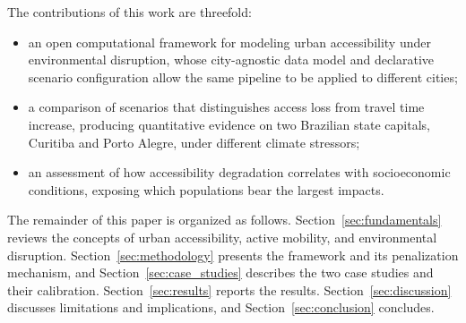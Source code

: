 The contributions of this work are threefold:

\begin{itemize}
  \item an open computational framework for modeling urban accessibility under environmental disruption, whose city-agnostic data model and declarative scenario configuration allow the same pipeline to be applied to different cities;
  \item a comparison of scenarios that distinguishes access loss from travel time increase, producing quantitative evidence on two Brazilian state capitals, Curitiba and Porto Alegre, under different climate stressors;
  \item an assessment of how accessibility degradation correlates with socioeconomic conditions, exposing which populations bear the largest impacts.
\end{itemize}

The remainder of this paper is organized as follows. Section~\ref{sec:fundamentals} reviews the concepts of urban accessibility, active mobility, and environmental disruption. Section~\ref{sec:methodology} presents the framework and its penalization mechanism, and Section~\ref{sec:case_studies} describes the two case studies and their calibration. Section~\ref{sec:results} reports the results. Section~\ref{sec:discussion} discusses limitations and implications, and Section~\ref{sec:conclusion} concludes.
